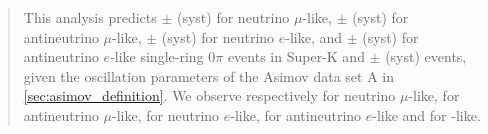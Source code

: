 \begin{frontmatter}
\begin{abstract}
This analysis predicts \NskOscExpectationNumu{} $\pm$ \NskOscExpectationNumuError{} (syst) for neutrino $\mu$-like, \NskOscExpectationNumuBar{} $\pm$ \NskOscExpectationNumuBarError{} (syst) for antineutrino $\mu$-like, \NskOscExpectationNue{} $\pm$ \NskOscExpectationNueError{} (syst) for neutrino $e$-like, and \NskOscExpectationNueBar{} $\pm$ \NskOscExpectationNueBarError{} (syst) for antineutrino $e$-like single-ring \( 0 \pi \) events in Super-K and \NskOscExpectationNueCConepi{} $\pm$ \NskOscExpectationNueCConepiError{} (syst) \nueCConepi{} events, given the oscillation parameters of the Asimov data set A in \ref{sec:asimov_definition}. We observe respectively \NskObservedNumu{} for neutrino $\mu$-like, \NskObservedNumuBar{}  for antineutrino $\mu$-like, \NskObservedNue{}  for neutrino $e$-like, \NskObservedNueBar{}  for antineutrino $e$-like and \NskObservedNueCConepi{} for \nueCConepi{}-like.

\end{abstract}

\end{frontmatter}
